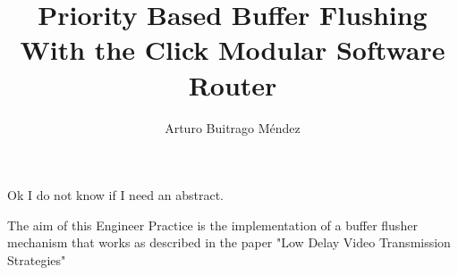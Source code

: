 \documentclass[12pt,a4paper]{report}
\title{Priority Based Buffer Flushing With the Click Modular Software Router}
\author{Arturo Buitrago Méndez}
\begin{document}

\makemtgtitle



Ok I do not know if I need an abstract.
\tableofcontents 


The aim of this Engineer Practice is the implementation of a buffer flusher mechanism that works as described in the paper "Low Delay Video Transmission Strategies" \cite{Bachhuber}


%
%
%
%

\appendix

\listoffigures
\listoftables
%
%
%



\end{document}

